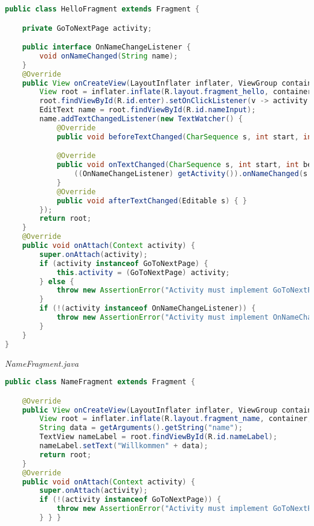\begin{lstlisting}[language=java]
public class HelloFragment extends Fragment {

    private GoToNextPage activity;

    public interface OnNameChangeListener {
        void onNameChanged(String name);
    }
    @Override
    public View onCreateView(LayoutInflater inflater, ViewGroup container, Bundle savedInstanceState) {
        View root = inflater.inflate(R.layout.fragment_hello, container, false);
        root.findViewById(R.id.enter).setOnClickListener(v -> activity.goToNextPage());
        EditText name = root.findViewById(R.id.nameInput);
        name.addTextChangedListener(new TextWatcher() {
            @Override
            public void beforeTextChanged(CharSequence s, int start, int count, int after) { }

            @Override
            public void onTextChanged(CharSequence s, int start, int before, int count) {
                ((OnNameChangeListener) getActivity()).onNameChanged(s.toString());
            }
            @Override
            public void afterTextChanged(Editable s) { }
        });
        return root;
    }
    @Override
    public void onAttach(Context activity) {
        super.onAttach(activity);
        if (activity instanceof GoToNextPage) {
            this.activity = (GoToNextPage) activity;
        } else {
            throw new AssertionError("Activity must implement GoToNextPage!");
        }
        if (!(activity instanceof OnNameChangeListener)) {
            throw new AssertionError("Activity must implement OnNameChangeListener!");
        }
    }
}
\end{lstlisting}
\textit{NameFragment.java}
\begin{lstlisting}[language=java]
public class NameFragment extends Fragment {

    @Override
    public View onCreateView(LayoutInflater inflater, ViewGroup container, Bundle savedInstanceState) {
        View root = inflater.inflate(R.layout.fragment_name, container, false);
        String data = getArguments().getString("name");
        TextView nameLabel = root.findViewById(R.id.nameLabel);
        nameLabel.setText("Willkommen" + data);
        return root;
    }
    @Override
    public void onAttach(Context activity) {
        super.onAttach(activity);
        if (!(activity instanceof GoToNextPage)) {
            throw new AssertionError("Activity must implement GoToNextPage!");
        } } }
\end{lstlisting}